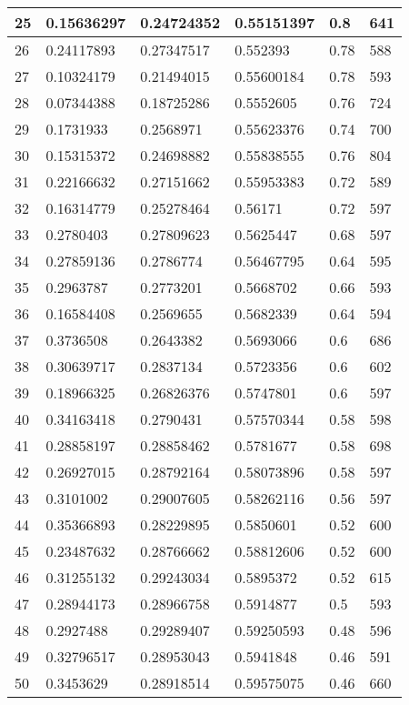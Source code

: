 \begin{longtable}{|l|l|l|l|l|l|}
25 & 0.15636297 & 0.24724352 & 0.55151397 & 0.8 & 641 \\ \hline 
26 & 0.24117893 & 0.27347517 & 0.552393 & 0.78 & 588 \\ \hline 
27 & 0.10324179 & 0.21494015 & 0.55600184 & 0.78 & 593 \\ \hline 
28 & 0.07344388 & 0.18725286 & 0.5552605 & 0.76 & 724 \\ \hline 
29 & 0.1731933 & 0.2568971 & 0.55623376 & 0.74 & 700 \\ \hline 
30 & 0.15315372 & 0.24698882 & 0.55838555 & 0.76 & 804 \\ \hline 
31 & 0.22166632 & 0.27151662 & 0.55953383 & 0.72 & 589 \\ \hline 
32 & 0.16314779 & 0.25278464 & 0.56171 & 0.72 & 597 \\ \hline 
33 & 0.2780403 & 0.27809623 & 0.5625447 & 0.68 & 597 \\ \hline 
34 & 0.27859136 & 0.2786774 & 0.56467795 & 0.64 & 595 \\ \hline 
35 & 0.2963787 & 0.2773201 & 0.5668702 & 0.66 & 593 \\ \hline 
36 & 0.16584408 & 0.2569655 & 0.5682339 & 0.64 & 594 \\ \hline 
37 & 0.3736508 & 0.2643382 & 0.5693066 & 0.6 & 686 \\ \hline 
38 & 0.30639717 & 0.2837134 & 0.5723356 & 0.6 & 602 \\ \hline 
39 & 0.18966325 & 0.26826376 & 0.5747801 & 0.6 & 597 \\ \hline 
40 & 0.34163418 & 0.2790431 & 0.57570344 & 0.58 & 598 \\ \hline 
41 & 0.28858197 & 0.28858462 & 0.5781677 & 0.58 & 698 \\ \hline 
42 & 0.26927015 & 0.28792164 & 0.58073896 & 0.58 & 597 \\ \hline 
43 & 0.3101002 & 0.29007605 & 0.58262116 & 0.56 & 597 \\ \hline 
44 & 0.35366893 & 0.28229895 & 0.5850601 & 0.52 & 600 \\ \hline 
45 & 0.23487632 & 0.28766662 & 0.58812606 & 0.52 & 600 \\ \hline 
46 & 0.31255132 & 0.29243034 & 0.5895372 & 0.52 & 615 \\ \hline 
47 & 0.28944173 & 0.28966758 & 0.5914877 & 0.5 & 593 \\ \hline 
48 & 0.2927488 & 0.29289407 & 0.59250593 & 0.48 & 596 \\ \hline 
49 & 0.32796517 & 0.28953043 & 0.5941848 & 0.46 & 591 \\ \hline 
50 & 0.3453629 & 0.28918514 & 0.59575075 & 0.46 & 660 \\ \hline 
\end{longtable}